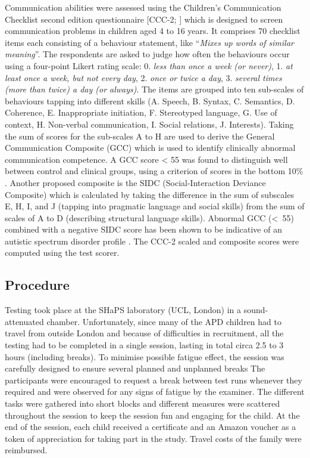 \documentclass[a4paper, twoside]{templates/ociamthesis}
\begin{document}
\hfill\break
Communication abilities were assessed using the Children's Communication Checklist second edition questionnaire {[}CCC-2; \textcite{Bishop2003}{]} which is designed to screen communication problems in children aged 4 to 16 years. It comprises 70 checklist items each consisting of a behaviour statement, like ``\emph{Mixes up words of similar meaning}''. The respondents are asked to judge how often the behaviours occur using a four-point Likert rating scale: 0. \emph{less than once a week (or never)}, 1. \emph{at least once a week, but not every day}, 2. \emph{once or twice a day}, 3. \emph{several times (more than twice) a day (or always)}. The items are grouped into ten sub-scales of behaviours tapping into different skills (A. Speech, B. Syntax, C. Semantics, D. Coherence, E. Inappropriate initiation, F. Stereotyped language, G. Use of context, H. Non-verbal communication, I. Social relations, J. Interests). Taking the sum of scores for the sub-scales A to H are used to derive the General Communication Composite (GCC) which is used to identify clinically abnormal communication competence. A GCC score \textless{} 55 was found to distinguish well between control and clinical groups, using a criterion of scores in the bottom 10\% \autocite{Norbury2005}. Another proposed composite is the SIDC (Social-Interaction Deviance Composite) which is calculated by taking the difference in the sum of subscales E, H, I, and J (tapping into pragmatic language and social skills) from the sum of scales of A to D (describing structural language skills). Abnormal GCC (\textless~55) combined with a negative SIDC score has been shown to be indicative of an autistic spectrum disorder profile \autocite{Bishop2003}. The CCC-2 scaled and composite scores were computed using the test scorer.\\

\hypertarget{procedure-3}{%
\subsection{Procedure}\label{procedure-3}}

Testing took place at the SHaPS laboratory (UCL, London) in a sound-attenuated chamber. Unfortunately, since many of the APD children had to travel from outside London and because of difficulties in recruitment, all the testing had to be completed in a single session, lasting in total circa 2.5 to 3 hours (including breaks). To minimise possible fatigue effect, the session was carefully designed to ensure several planned and unplanned breaks The participants were encouraged to request a break between test runs whenever they required and were observed for any signs of fatigue by the examiner. The different tasks were gathered into short blocks and different measures were scattered throughout the session to keep the session fun and engaging for the child. At the end of the session, each child received a certificate and an Amazon voucher as a token of appreciation for taking part in the study. Travel costs of the family were reimbursed.\\
\end{document}
